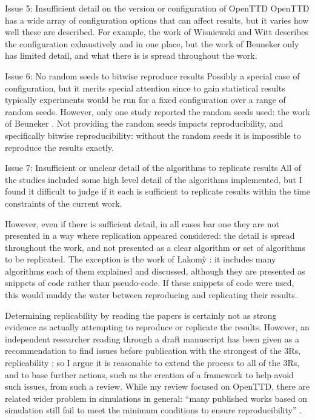 \documentclass[logo,msc,dsti]{style/infthesis}    %
\begin{document}
{\begin{itemize}
\begin{descitem}{Issue 5: Insufficient detail on the version or configuration of OpenTTD}
OpenTTD has a wide array of configuration options that can affect results, but it varies how well these are described. For example, the work of Wisniewski and Witt \cite{wisniewski2011artificial} describes the configuration exhaustively and in one place, but the work of Beuneker \cite{bijlsma2014evolving} only has limited detail, and what there is is spread throughout the work.
\end{descitem}
\begin{descitem}{Issue 6: No random seeds to bitwise reproduce results}
Possibly a special case of configuration, but it merits special attention since to gain statistical results typically experiments would be run for a fixed configuration over a range of random seeds. However, only one study reported the random seeds used: the work of Beuneker \cite{beuneker2019autonomous}. Not providing the random seeds impacts reproducibility, and specifically bitwise reproducibility: without the random seeds it is impossible to reproduce the results exactly.
\end{descitem}

\begin{descitem}{Issue 7: Insufficient or unclear detail of the algorithms to replicate results}
All of the studies included some high level detail of the algorithms implemented, but I found it difficult to judge if it each is sufficient to replicate results within the time constraints of the current work.

However, even if there is sufficient detail, in all cases bar one they are not presented in a way where replication appeared considered: the detail is spread throughout the work, and not presented as a clear algorithm or set of algorithms to be replicated. The exception is the work of {Lakom{\`y}} \cite{lakomy2020railroad}: it includes many algorithms each of them explained and discussed, although they are presented as snippets of code rather than pseudo-code. If these snippets of code were used, this would muddy the water between reproducing and replicating their results.
\end{descitem}

\end{itemize}
%
Determining replicability by reading the papers is certainly not as strong evidence as actually attempting to reproduce or replicate the results. However, an independent researcher reading through a draft manuscript has been given as a recommendation to find issues before publication with the strongest of the 3Rs, replicability \cite{luijken2024replicability}; so I argue it is reasonable to extend the process to all of the 3Rs, and to base further actions, such as the creation of a framework to help avoid such issues, from such a review. While my review focused on OpenTTD, there are related wider problem in simulations in general: ``many published works based on simulation still fail to meet the minimum conditions to ensure reproducibility'' \cite{dalle2012reproducibility}.

}
\end{document}
